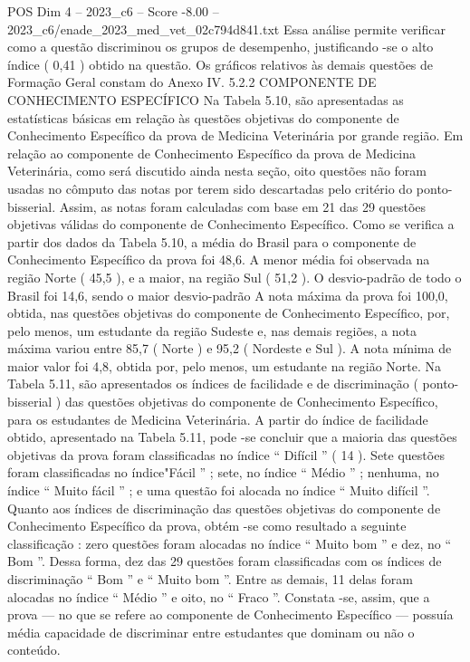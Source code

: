 \begin{textsample}{POS Dim 4 – 2023\_c6 – Score -8.00 – 2023\_c6/enade\_2023\_med\_vet\_02c794d841.txt}
Essa análise permite verificar como a questão discriminou os grupos de desempenho, justificando -se o alto índice ( 0,41 ) obtido na questão.
Os gráficos relativos às demais questões de Formação Geral constam do Anexo IV. 5.2.2 COMPONENTE DE CONHECIMENTO ESPECÍFICO Na Tabela 5.10, são apresentadas as estatísticas básicas em relação às questões objetivas do componente de Conhecimento Específico da prova de Medicina Veterinária por grande região.
Em relação ao componente de Conhecimento Específico da prova de Medicina Veterinária, como será discutido ainda nesta seção, oito questões não foram usadas no cômputo das notas por terem sido descartadas pelo critério do ponto-bisserial.
Assim, as notas foram calculadas com base em 21 das 29 questões objetivas válidas do componente de Conhecimento Específico.
Como se verifica a partir dos dados da Tabela 5.10, a média do Brasil para o componente de Conhecimento Específico da prova foi 48,6.
A menor média foi observada na região Norte ( 45,5 ), e a maior, na região Sul ( 51,2 ).
O desvio-padrão de todo o Brasil foi 14,6, sendo o maior desvio-padrão A nota máxima da prova foi 100,0, obtida, nas questões objetivas do componente de Conhecimento Específico, por, pelo menos, um estudante da região Sudeste e, nas demais regiões, a nota máxima variou entre 85,7 ( Norte ) e 95,2 ( Nordeste e Sul ).
A nota mínima de maior valor foi 4,8, obtida por, pelo menos, um estudante na região Norte.
Na Tabela 5.11, são apresentados os índices de facilidade e de discriminação ( ponto-bisserial ) das questões objetivas do componente de Conhecimento Específico, para os estudantes de Medicina Veterinária.
A partir do índice de facilidade obtido, apresentado na Tabela 5.11, pode -se concluir que a maioria das questões objetivas da prova foram classificadas no índice “ Difícil ” ( 14 ).
Sete questões foram classificadas no índice"Fácil ” ; sete, no índice “ Médio ” ; nenhuma, no índice “ Muito fácil ” ; e uma questão foi alocada no índice “ Muito difícil ”.
Quanto aos índices de discriminação das questões objetivas do componente de Conhecimento Específico da prova, obtém -se como resultado a seguinte classificação : zero questões foram alocadas no índice “ Muito bom ” e dez, no “ Bom ”.
Dessa forma, dez das 29 questões foram classificadas com os índices de discriminação “ Bom ” e “ Muito bom ”.
Entre as demais, 11 delas foram alocadas no índice “ Médio ” e oito, no “ Fraco ”.
Constata -se, assim, que a prova — no que se refere ao componente de Conhecimento Específico — possuía média capacidade de discriminar entre estudantes que dominam ou não o conteúdo.

\end{textsample}
